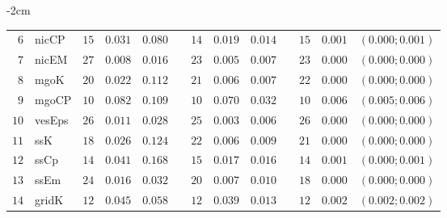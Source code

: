 \begin{table*}[!htbp]
\begin{adjustwidth*}{}{-2cm}
\begin{tabular}{@{}rlrrrrrrrrrcc@{}}
\footnotesize{$6 $} & \footnotesize{nicCP    } & \footnotesize{$15$} & \footnotesize{$0.031$} & \footnotesize{$0.080$} && \footnotesize{$14$} & \footnotesize{$0.019$} & \footnotesize{$0.014$} && \footnotesize{$15$} & \footnotesize{$0.001$} & \footnotesize{$(0.000;0.001)$} \\
\footnotesize{$7 $} & \footnotesize{nicEM    } & \footnotesize{$27$} & \footnotesize{$0.008$} & \footnotesize{$0.016$} && \footnotesize{$23$} & \footnotesize{$0.005$} & \footnotesize{$0.007$} && \footnotesize{$23$} & \footnotesize{$0.000$} & \footnotesize{$(0.000;0.000)$} \\
\footnotesize{$8 $} & \footnotesize{mgoK     } & \footnotesize{$20$} & \footnotesize{$0.022$} & \footnotesize{$0.112$} && \footnotesize{$21$} & \footnotesize{$0.006$} & \footnotesize{$0.007$} && \footnotesize{$22$} & \footnotesize{$0.000$} & \footnotesize{$(0.000;0.000)$} \\
\footnotesize{$9 $} & \footnotesize{mgoCP    } & \footnotesize{$10$} & \footnotesize{$0.082$} & \footnotesize{$0.109$} && \footnotesize{$10$} & \footnotesize{$0.070$} & \footnotesize{$0.032$} && \footnotesize{$10$} & \footnotesize{$0.006$} & \footnotesize{$(0.005;0.006)$} \\
\footnotesize{$10$} & \footnotesize{vesEps   } & \footnotesize{$26$} & \footnotesize{$0.011$} & \footnotesize{$0.028$} && \footnotesize{$25$} & \footnotesize{$0.003$} & \footnotesize{$0.006$} && \footnotesize{$26$} & \footnotesize{$0.000$} & \footnotesize{$(0.000;0.000)$} \\
\footnotesize{$11$} & \footnotesize{ssK      } & \footnotesize{$18$} & \footnotesize{$0.026$} & \footnotesize{$0.124$} && \footnotesize{$22$} & \footnotesize{$0.006$} & \footnotesize{$0.009$} && \footnotesize{$21$} & \footnotesize{$0.000$} & \footnotesize{$(0.000;0.000)$} \\
\footnotesize{$12$} & \footnotesize{ssCp     } & \footnotesize{$14$} & \footnotesize{$0.041$} & \footnotesize{$0.168$} && \footnotesize{$15$} & \footnotesize{$0.017$} & \footnotesize{$0.016$} && \footnotesize{$14$} & \footnotesize{$0.001$} & \footnotesize{$(0.000;0.001)$} \\
\footnotesize{$13$} & \footnotesize{ssEm     } & \footnotesize{$24$} & \footnotesize{$0.016$} & \footnotesize{$0.032$} && \footnotesize{$20$} & \footnotesize{$0.007$} & \footnotesize{$0.010$} && \footnotesize{$18$} & \footnotesize{$0.000$} & \footnotesize{$(0.000;0.000)$} \\
\footnotesize{$14$} & \footnotesize{gridK    } & \footnotesize{$12$} & \footnotesize{$0.045$} & \footnotesize{$0.058$} && \footnotesize{$12$} & \footnotesize{$0.039$} & \footnotesize{$0.013$} && \footnotesize{$12$} & \footnotesize{$0.002$} & \footnotesize{$(0.002;0.002)$} \\

\end{tabular}
\end{adjustwidth*}
\end{table*}
